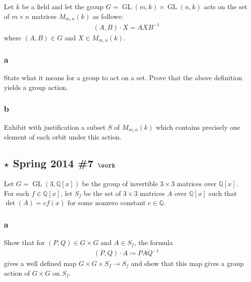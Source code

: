 Let \(k\) be a field and let the group
\(G = \operatorname{GL}(m, k) \times\operatorname{GL}(n, k)\) acts on
the set of \(m\times n\) matrices \(M_{m, n}(k)\) as follows:
\begin{align*}
(A, B) \cdot X = AXB^{-1}
\end{align*}
where \((A, B) \in G\) and \(X\in M_{m, n}(k)\).

\hypertarget{a-97}{%
\subsubsection{a}\label{a-97}}

State what it means for a group to act on a set. Prove that the above
definition yields a group action.

\hypertarget{b-87}{%
\subsubsection{b}\label{b-87}}

Exhibit with justification a subset \(S\) of \(M_{m, n}(k)\) which
contains precisely one element of each orbit under this action.

\hypertarget{star-spring-2014-7-work}{%
\subsection{\texorpdfstring{\(\star\) Spring 2014 \#7
\(\work\)}{\textbackslash star Spring 2014 \#7 \textbackslash work}}\label{star-spring-2014-7-work}}

Let \(G = \operatorname{GL}(3, {\mathbb{Q}}[x])\) be the group of
invertible \(3\times 3\) matrices over \({\mathbb{Q}}[x]\). For each
\(f\in {\mathbb{Q}}[x]\), let \(S_f\) be the set of \(3\times 3\)
matrices \(A\) over \({\mathbb{Q}}[x]\) such that \(\det(A) = c f(x)\)
for some nonzero constant \(c\in {\mathbb{Q}}\).

\hypertarget{a-98}{%
\subsubsection{a}\label{a-98}}

Show that for \((P, Q) \in G\times G\) and \(A\in S_f\), the formula
\begin{align*}
(P, Q)\cdot A \coloneqq PAQ^{-1}
\end{align*}
gives a well defined map \(G\times G \times S_f \to S_f\) and show that
this map gives a group action of \(G\times G\) on \(S_f\).

